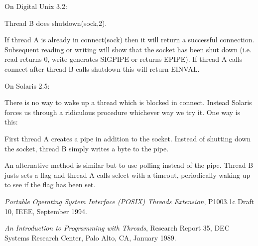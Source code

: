 \documentclass[11pt,twoside,onecolumn]{article}
\begin{document}
On Digital Unix 3.2:

Thread B does shutdown(sock,2).

If thread A is already in connect(sock) then it will return a successful
connection.  Subsequent reading or writing will show that the socket has been
shut down (i.e. read returns 0, write generates SIGPIPE or returns EPIPE).  If
thread A calls connect after thread B calls shutdown this will return EINVAL.


On Solaris 2.5:

There is no way to wake up a thread which is blocked in connect.  Instead
Solaris forces us through a ridiculous procedure whichever way we try it.
One way is this:

First thread A creates a pipe in addition to the socket.  Instead of shutting
down the socket, thread B simply writes a byte to the pipe.


An alternative method is similar but to use polling instead of the pipe.
Thread B justs sets a flag and thread A calls select with a timeout,
periodically waking up to see if the flag has been set.


\begin{thebibliography}{lo}

{\em Portable Operating System Interface (POSIX) Threads Extension},
P1003.1c Draft 10,
IEEE,
September 1994.

{\em An Introduction to Programming with Threads},
Research Report 35,
DEC Systems Research Center,
Palo Alto, CA,
January 1989.

\end{thebibliography}
\end{document}
